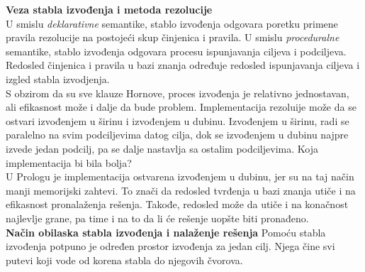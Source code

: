 \documentclass[../main.tex]{subfiles}
\begin{document}
{\bf Veza stabla izvođenja i metoda rezolucije} \\
U smislu {\it deklarativne} semantike, stablo izvođenja odgovara poretku primene pravila rezolucije na postojeći skup činjenica i pravila. U smislu {\it proceduralne} semantike, stablo izvođenja odgovara procesu ispunjavanja ciljeva i podciljeva. Redosled činjenica i pravila u bazi znanja određuje redosled ispunjavanja ciljeva i izgled stabla izvodjenja. 
\\
S obzirom da su sve klauze Hornove, proces izvođenja je relativno jednostavan, ali efikasnost može i dalje da bude problem. Implementacija rezoluije može da se ostvari izvođenjem u širinu i izvođenjem u dubinu. Izvođenjem u širinu, radi se paralelno na svim podciljevima datog cilja, dok se izvođenjem u dubinu najpre izvede jedan podcilj, pa se dalje nastavlja sa ostalim podciljevima. Koja implementacija bi bila bolja?
\\
U Prologu je implementacija ostvarena izvođenjem u dubinu, jer su na taj način manji memorijski zahtevi. To znači da redosled tvrđenja u bazi znanja utiče i na efikasnost pronalaženja rešenja. Takođe, redosled može da utiče i na konačnost najlevlje grane, pa time i na to da li će rešenje uopšte biti pronađeno.
\\
{\bf Način obilaska stabla izvođenja i nalaženje rešenja}
Pomoću stabla izvođenja potpuno je određen prostor izvođenja za jedan cilj. Njega čine svi putevi koji vode od korena stabla do njegovih čvorova.
\end{document}
